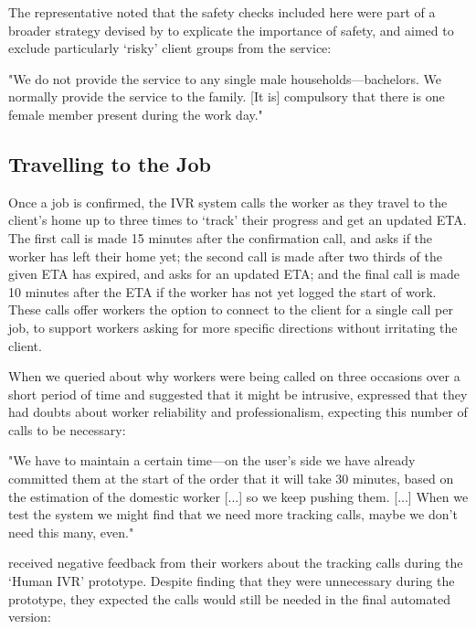 The \NGO{} representative noted that the safety checks included here were part of a broader strategy devised by \NGO{} to explicate the importance of safety, and aimed to exclude particularly `risky' client groups from the service:

\begin{displayquote}
"We do not provide the service to any single male households---bachelors. We normally provide the service to the family. [It is] compulsory that there is one female member present during the work day."
\end{displayquote}

\subsection{Travelling to the Job}
Once a job is confirmed, the IVR system calls the worker as they travel to the client's home up to three times to `track’ their progress and get an updated ETA. The first call is made 15 minutes after the confirmation call, and asks if the worker has left their home yet; the second call is made after two thirds of the given ETA has expired, and asks for an updated ETA; and the final call is made 10 minutes after the ETA if the worker has not yet logged the start of work. These calls offer workers the option to connect to the client for a single call per job, to support workers asking for more specific directions without irritating the client. 

When we queried about why workers were being called on three occasions over a short period of time and suggested that it might be intrusive, \PC{} expressed that they had doubts about worker reliability and professionalism, expecting this number of calls to be necessary:

\begin{displayquote}
"We have to maintain a certain time---on the user’s side we have already committed them at the start of the order that it will take 30 minutes, based on the estimation of the domestic worker [...] so we keep pushing them. [...] When we test the system we might find that we need more tracking calls, maybe we don’t need this many, even."
\end{displayquote}

\PC{} received negative feedback from their workers about the tracking calls during the `Human IVR' prototype. Despite finding that they were unnecessary during the prototype, they expected the calls would still be needed in the final automated version:

